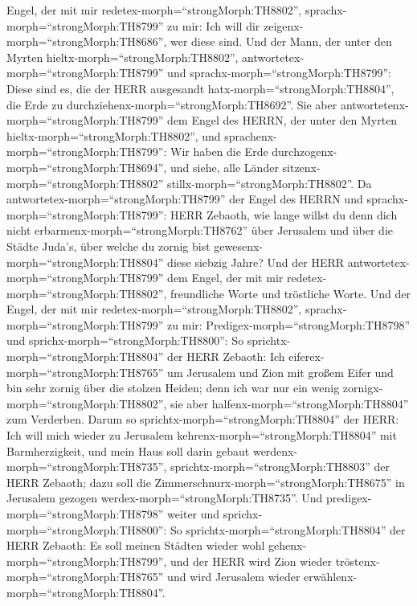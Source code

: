 Engel, der mit mir redetex-morph=``strongMorph:TH8802'',
sprachx-morph=``strongMorph:TH8799'' zu mir: Ich will dir
zeigenx-morph=``strongMorph:TH8686'', wer diese sind.  Und
der Mann, der unter den Myrten hieltx-morph=``strongMorph:TH8802'',
antwortetex-morph=``strongMorph:TH8799'' und
sprachx-morph=``strongMorph:TH8799'': Diese sind es, die der HERR
ausgesandt hatx-morph=``strongMorph:TH8804'', die Erde zu
durchziehenx-morph=``strongMorph:TH8692''.  Sie aber
antwortetenx-morph=``strongMorph:TH8799'' dem Engel des HERRN, der unter
den Myrten hieltx-morph=``strongMorph:TH8802'', und
sprachenx-morph=``strongMorph:TH8799'': Wir haben die Erde
durchzogenx-morph=``strongMorph:TH8694'', und siehe, alle Länder
sitzenx-morph=``strongMorph:TH8802''
stillx-morph=``strongMorph:TH8802''.  Da
antwortetex-morph=``strongMorph:TH8799'' der Engel des HERRN und
sprachx-morph=``strongMorph:TH8799'': HERR Zebaoth, wie lange willst du
denn dich nicht erbarmenx-morph=``strongMorph:TH8762'' über Jerusalem
und über die Städte Juda's, über welche du zornig bist
gewesenx-morph=``strongMorph:TH8804'' diese siebzig Jahre? 
Und der HERR antwortetex-morph=``strongMorph:TH8799'' dem Engel, der mit
mir redetex-morph=``strongMorph:TH8802'', freundliche Worte und
tröstliche Worte.  Und der Engel, der mit mir
redetex-morph=``strongMorph:TH8802'',
sprachx-morph=``strongMorph:TH8799'' zu mir:
Predigex-morph=``strongMorph:TH8798'' und
sprichx-morph=``strongMorph:TH8800'': So
sprichtx-morph=``strongMorph:TH8804'' der HERR Zebaoth: Ich
eiferex-morph=``strongMorph:TH8765'' um Jerusalem und Zion mit großem
Eifer  und bin sehr zornig über die stolzen Heiden; denn
ich war nur ein wenig zornigx-morph=``strongMorph:TH8802'', sie aber
halfenx-morph=``strongMorph:TH8804'' zum Verderben.  Darum
so sprichtx-morph=``strongMorph:TH8804'' der HERR: Ich will mich wieder
zu Jerusalem kehrenx-morph=``strongMorph:TH8804'' mit Barmherzigkeit,
und mein Haus soll darin gebaut werdenx-morph=``strongMorph:TH8735'',
sprichtx-morph=``strongMorph:TH8803'' der HERR Zebaoth; dazu soll die
Zimmerschnurx-morph=``strongMorph:TH8675'' in Jerusalem gezogen
werdex-morph=``strongMorph:TH8735''.  Und
predigex-morph=``strongMorph:TH8798'' weiter und
sprichx-morph=``strongMorph:TH8800'': So
sprichtx-morph=``strongMorph:TH8804'' der HERR Zebaoth: Es soll meinen
Städten wieder wohl gehenx-morph=``strongMorph:TH8799'', und der HERR
wird Zion wieder tröstenx-morph=``strongMorph:TH8765'' und wird
Jerusalem wieder erwählenx-morph=``strongMorph:TH8804''. 
